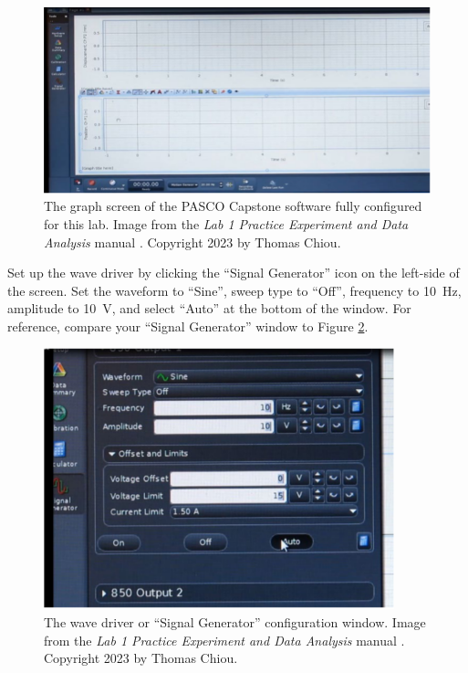 \documentclass[12 pt]{report}
\begin{document}
\begin{figure}[htbp]
\centering
\includegraphics[width=5in]{images/PASCO_Main_Page}
\caption{The graph screen of the PASCO Capstone software fully configured for this lab. Image from the \textit{Lab 1 Practice Experiment and Data Analysis} manual \cite{lab_procedures}. Copyright 2023 by Thomas Chiou.}
\label{fig:pasco_main_page}
\end{figure}

Set up the wave driver by clicking the ``Signal Generator'' icon on the left-side of the screen.  Set the waveform to ``Sine'', sweep type to ``Off'', frequency to \qty{10}{\hertz}, amplitude to \qty{10}{\volt}, and select ``Auto'' at the bottom of the window. For reference, compare your ``Signal Generator'' window to Figure \ref{fig:wave_driver_setup}.

\begin{figure}[htbp]
\centering
\includegraphics[width=4in]{images/Wave_Driver_Setup}
\caption{The wave driver or ``Signal Generator'' configuration window. Image from the \textit{Lab 1 Practice Experiment and Data Analysis} manual \cite{lab_procedures}. Copyright 2023 by Thomas Chiou.}
\label{fig:wave_driver_setup}
\end{figure}
\end{document}
